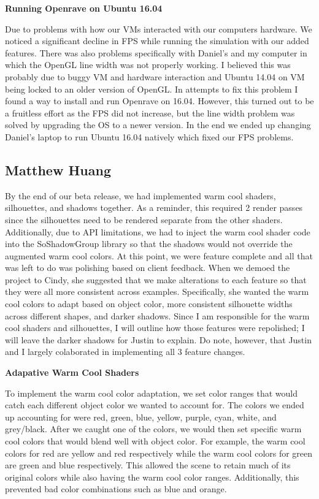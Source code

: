 \documentclass[10pt,journal,compsoc,draftclsnofoot]{IEEEtran}
\begin{document}
\begin{flushleft}
\textbf{Running Openrave on Ubuntu 16.04}
\par
Due to problems with how our VMs interacted with our computers hardware.
We noticed a significant decline in FPS while running the simulation with our added features.
There was also problems specifically with Daniel's and my computer in which the OpenGL line width was not properly working.
I believed this was probably due to buggy VM and hardware interaction and Ubuntu 14.04 on VM being locked to an older version of OpenGL.
In attempts to fix this problem I found a way to install and run Openrave on 16.04.
However, this turned out to be a fruitless effort as the FPS did not increase, but the line width problem was solved by upgrading the OS to a newer version.
In the end we ended up changing Daniel's laptop to run Ubuntu 16.04 natively which fixed our FPS problems.
\vspace{3mm}

\newpage

\subsection{Matthew Huang}
\par
By the end of our beta release, we had implemented warm cool shaders, silhouettes, and shadows together.
As a reminder, this required 2 render passes since the silhouettes need to be rendered separate from the other shaders.
Additionally, due to API limitations, we had to inject the warm cool shader code into the SoShadowGroup library so that the shadows would not override the augmented warm cool colors.
At this point, we were feature complete and all that was left to do was polishing based on client feedback.
When we demoed the project to Cindy, she suggested that we make alterations to each feature so that they were all more consistent across examples.
Specifically, she wanted the warm cool colors to adapt based on object color, more consistent silhouette widths across different shapes, and darker shadows.
Since I am responsible for the warm cool shaders and silhouettes, I will outline how those features were repolished; I will leave the darker shadows for Justin to explain.
Do note, however, that Justin and I largely colaborated in implementing all 3 feature changes.
\vspace{3mm}

\textbf{Adapative Warm Cool Shaders}
\par
To implement the warm cool color adaptation, we set color ranges that would catch each different object color we wanted to account for.
The colors we ended up accounting for were red, green, blue, yellow, purple, cyan, white, and grey/black.
After we caught one of the colors, we would then set specific warm cool colors that would blend well with object color.
For example, the warm cool colors for red are yellow and red respectively while the warm cool colors for green are green and blue respectively.
This allowed the scene to retain much of its original colors while also having the warm cool color ranges.
Additionally, this prevented bad color combinations such as blue and orange.
\vspace{3mm}


\end{flushleft}
\end{document}
